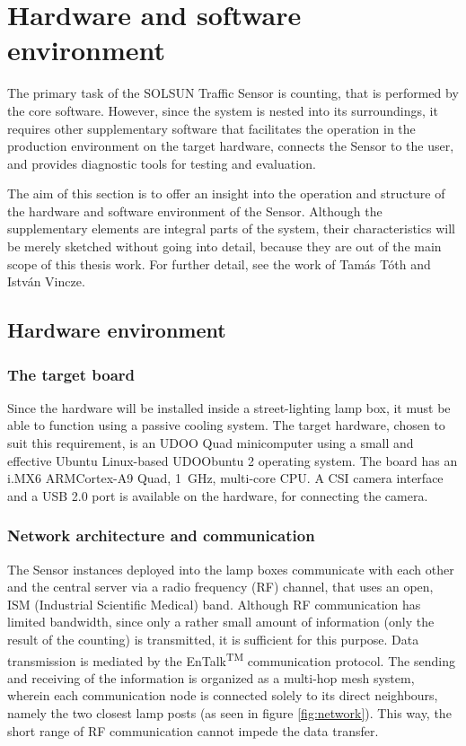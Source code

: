 \chapter{Hardware and software environment}\label{chap:Environment}
The primary task of the SOLSUN Traffic Sensor is counting, that is performed by the core software.
However, since the system is nested into its surroundings, it requires other supplementary software that facilitates the operation in the production environment on the target hardware, connects the Sensor to the user, and provides diagnostic tools for testing and evaluation.

The aim of this section is to offer an insight into the operation and structure of the hardware and software environment of the Sensor.
Although the supplementary elements are integral parts of the system, their characteristics will be merely sketched without going into detail, because they are out of the main scope of this thesis work.
For further detail, see the work of Tam{\'a}s T{\'o}th\cite{Toth2016} and Istv{\'a}n Vincze\cite{Vincze2016}.
\section{Hardware environment}
\subsection{The target board}
Since the hardware will be installed inside a street-lighting lamp box, it must be able to function using a passive cooling system.
The target hardware, chosen to suit this requirement, is an UDOO Quad minicomputer using a small and effective Ubuntu Linux-based UDOObuntu 2 operating system.
The board has an i.MX6 ARM\reg Cortex\reg-A9 Quad, \SI{1}{GHz}, multi-core CPU\cite{UDOO, UDOO2}.
A CSI camera interface and a USB 2.0 port is available on the hardware, for connecting the camera.

\subsection{Network architecture and communication}
The Sensor instances deployed into the lamp boxes communicate with each other and the central server via a radio frequency (RF) channel, that uses an open, ISM (Industrial Scientific Medical) band.
Although RF communication has limited bandwidth, since only a rather small amount of information (only the result of the counting) is transmitted, it is sufficient for this purpose.
Data transmission is mediated by the EnTalk\textsuperscript{TM} communication protocol\cite{EnTalk}.
The sending and receiving of the information is organized as a multi-hop mesh system, wherein each communication node is connected solely to its direct neighbours, namely the two closest lamp posts (as seen in figure \ref{fig:network}).
This way, the short range of RF communication cannot impede the data transfer.

